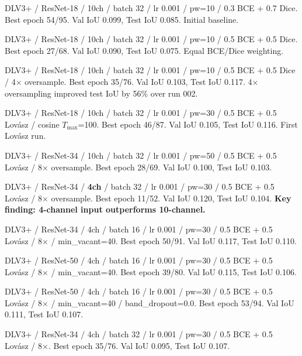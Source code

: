 \begin{description}[style=unboxed,leftmargin=0cm]
  \item[Run 001] DLV3+ / ResNet-18 / 10ch / batch 32 / lr 0.001 / pw=10 / 0.3 BCE + 0.7 Dice.
    Best epoch 54/95. Val IoU 0.099, Test IoU 0.085. Initial baseline.

  \item[Run 002] DLV3+ / ResNet-18 / 10ch / batch 32 / lr 0.001 / pw=10 / 0.5 BCE + 0.5 Dice.
    Best epoch 27/68. Val IoU 0.090, Test IoU 0.075. Equal BCE/Dice weighting.

  \item[Run 003] DLV3+ / ResNet-18 / 10ch / batch 32 / lr 0.001 / pw=10 / 0.5 BCE + 0.5 Dice / 4$\times$ oversample.
    Best epoch 35/76. Val IoU 0.103, Test IoU 0.117. 4$\times$ oversampling improved test IoU by 56\% over run 002.

  \item[Run 004] DLV3+ / ResNet-18 / 10ch / batch 32 / lr 0.001 / pw=30 / 0.5 BCE + 0.5 Lov\'{a}sz / cosine $T_{\max}$=100.
    Best epoch 46/87. Val IoU 0.105, Test IoU 0.116. First Lov\'{a}sz run.

  \item[Run 005] DLV3+ / ResNet-34 / 10ch / batch 32 / lr 0.001 / pw=50 / 0.5 BCE + 0.5 Lov\'{a}sz / 8$\times$ oversample.
    Best epoch 28/69. Val IoU 0.100, Test IoU 0.103.

  \item[Run 007] DLV3+ / ResNet-34 / \textbf{4ch} / batch 32 / lr 0.001 / pw=30 / 0.5 BCE + 0.5 Lov\'{a}sz / 8$\times$ oversample.
    Best epoch 11/52. Val IoU 0.120, Test IoU 0.104. \textbf{Key finding: 4-channel input outperforms 10-channel.}

  \item[Run 009] DLV3+ / ResNet-34 / 4ch / batch 16 / lr 0.001 / pw=30 / 0.5 BCE + 0.5 Lov\'{a}sz / 8$\times$ / min\_vacant=40.
    Best epoch 50/91. Val IoU 0.117, Test IoU 0.110.

  \item[Run 010] DLV3+ / ResNet-50 / 4ch / batch 16 / lr 0.001 / pw=30 / 0.5 BCE + 0.5 Lov\'{a}sz / 8$\times$ / min\_vacant=40.
    Best epoch 39/80. Val IoU 0.115, Test IoU 0.106.

  \item[Run 011] DLV3+ / ResNet-50 / 4ch / batch 16 / lr 0.001 / pw=30 / 0.5 BCE + 0.5 Lov\'{a}sz / 8$\times$ / min\_vacant=40 / band\_dropout=0.0.
    Best epoch 53/94. Val IoU 0.111, Test IoU 0.107.

  \item[Run 016] DLV3+ / ResNet-34 / 4ch / batch 32 / lr 0.001 / pw=30 / 0.5 BCE + 0.5 Lov\'{a}sz / 8$\times$.
    Best epoch 35/76. Val IoU 0.095, Test IoU 0.107.
\end{description}

